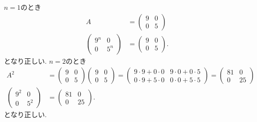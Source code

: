 \begin{checkanswer}%
  $n=1$のとき
\begin{align*}
  A&=\begin{pmatrix}9&0\\0&5\end{pmatrix}\\
  \begin{pmatrix}9^n&0\\0&5^n\end{pmatrix}&=\begin{pmatrix}9&0\\0&5\end{pmatrix}.
\end{align*}
となり正しい.
  $n=2$のとき
\begin{align*}
  A^2&=\begin{pmatrix}9&0\\0&5\end{pmatrix}\begin{pmatrix}9&0\\0&5\end{pmatrix}
    =\begin{pmatrix}9\cdot 9+0\cdot 0&9\cdot 0+0\cdot5 \\0\cdot 9+5\cdot 0&0\cdot 0+5\cdot 5\end{pmatrix}
    =\begin{pmatrix}81&0\\0&25\end{pmatrix}
  \\
  \begin{pmatrix}9^2&0\\0&5^2\end{pmatrix}&=\begin{pmatrix}81&0\\0&25\end{pmatrix}.
\end{align*}
となり正しい.  
\end{checkanswer}


